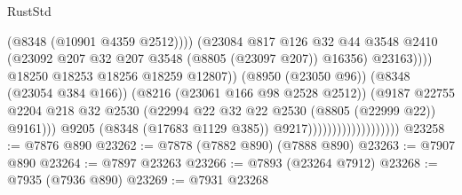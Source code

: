 \begin{lexlean}{RustStd}
\begin{coremodule}
                                                          (@8348 (@10901 @4359 @2512))))
                                                      (@23084
                                                        @817
                                                        @126
                                                        @32
                                                        @44
                                                        @3548
                                                        @2410
                                                        (@23092
                                                          @207
                                                          @32
                                                          @207
                                                          @3548
                                                          (@8805 (@23097 @207))
                                                          @16356)
                                                        @23163))))
                                                @18250
                                                @18253
                                                @18256
                                                @18259
                                                @12807))
                                            (@8950 (@23050 @96))
                                            (@8348 (@23054 @384 @166))
                                            (@8216 (@23061 @166 @98 @2528 @2512))
                                            (@9187
                                              @22755
                                              @2204
                                              @218
                                              @32
                                              @2530
                                              (@22994
                                                @22
                                                @32
                                                @22
                                                @2530
                                                (@8805 (@22999 @22))
                                                @9161)))
                                          @9205
                                          (@8348 (@17683 @1129 @385))
                                          @9217)))))))))))))))))))
@23258 := @7876 @890
@23262 := @7878 (@7882 @890) (@7888 @890)
@23263 := @7907 @890
@23264 := @7897 @23263
@23266 := @7893 (@23264 @7912)
@23268 := @7935 (@7936 @890)
@23269 := @7931 @23268

\end{coremodule}
\end{lexlean}
